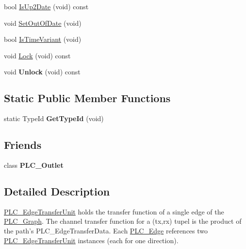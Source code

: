 \begin{DoxyCompactItemize}
bool \hyperlink{classns3_1_1PLC__EdgeTransferUnit_ad71b374a26276cf8187e14e25642f4e9}{\-Is\-Up2\-Date} (void) const 
\item 
void \hyperlink{classns3_1_1PLC__EdgeTransferUnit_a7c9e3cda7687e848b5a54c92fda9ff1b}{\-Set\-Out\-Of\-Date} (void)
\item 
bool \hyperlink{classns3_1_1PLC__EdgeTransferUnit_a720b5892580b59087166d65ee9047521}{\-Is\-Time\-Variant} (void)
\item 
void \hyperlink{classns3_1_1PLC__EdgeTransferUnit_a904d5e7b7c64ed14e6c4fff27453f4d9}{\-Lock} (void) const 
\item 
\hypertarget{classns3_1_1PLC__EdgeTransferUnit_ac6caf9f9cb662bc5f32b134b171c6c49}{void {\bfseries \-Unlock} (void) const }\label{classns3_1_1PLC__EdgeTransferUnit_ac6caf9f9cb662bc5f32b134b171c6c49}

\end{DoxyCompactItemize}
\subsection*{\-Static \-Public \-Member \-Functions}
\begin{DoxyCompactItemize}
\item 
\hypertarget{classns3_1_1PLC__EdgeTransferUnit_a1db4df9206bf22cd277911194692e5bd}{static \-Type\-Id {\bfseries \-Get\-Type\-Id} (void)}\label{classns3_1_1PLC__EdgeTransferUnit_a1db4df9206bf22cd277911194692e5bd}

\end{DoxyCompactItemize}
\subsection*{\-Friends}
\begin{DoxyCompactItemize}
\item 
\hypertarget{classns3_1_1PLC__EdgeTransferUnit_ae6906119e2bc3e6a134b7087a1ad1afe}{class {\bfseries \-P\-L\-C\-\_\-\-Outlet}}\label{classns3_1_1PLC__EdgeTransferUnit_ae6906119e2bc3e6a134b7087a1ad1afe}

\end{DoxyCompactItemize}


\subsection{\-Detailed \-Description}
\hyperlink{classns3_1_1PLC__EdgeTransferUnit}{\-P\-L\-C\-\_\-\-Edge\-Transfer\-Unit} holds the transfer function of a single edge of the \hyperlink{classns3_1_1PLC__Graph}{\-P\-L\-C\-\_\-\-Graph}. \-The channel transfer function for a (tx,rx) tupel is the product of the path's \-P\-L\-C\-\_\-\-Edge\-Transfer\-Data. \-Each \hyperlink{classns3_1_1PLC__Edge}{\-P\-L\-C\-\_\-\-Edge} references two \hyperlink{classns3_1_1PLC__EdgeTransferUnit}{\-P\-L\-C\-\_\-\-Edge\-Transfer\-Unit} instances (each for one direction). 

